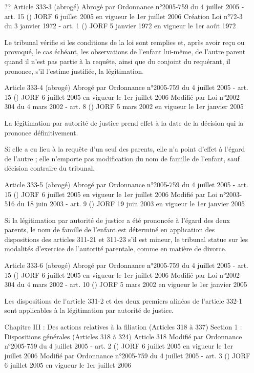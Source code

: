 \documentclass[
  12pt,
]{book}
\begin{document}
\begin{encadre}{??}
Article 333-3 (abrogé)
Abrogé par Ordonnance n°2005-759 du 4 juillet 2005 - art. 15 () JORF 6 juillet 2005 en vigueur le 1er juillet 2006
Création Loi n°72-3 du 3 janvier 1972 - art. 1 () JORF 5 janvier 1972 en vigueur le 1er août 1972

Le tribunal vérifie si les conditions de la loi sont remplies et, après avoir reçu ou provoqué, le cas échéant, les observations de l'enfant lui-même, de l'autre parent quand il n'est pas partie à la requête, ainsi que du conjoint du requérant, il prononce, s'il l'estime justifiée, la légitimation.

Article 333-4 (abrogé)
Abrogé par Ordonnance n°2005-759 du 4 juillet 2005 - art. 15 () JORF 6 juillet 2005 en vigueur le 1er juillet 2006
Modifié par Loi n°2002-304 du 4 mars 2002 - art. 8 () JORF 5 mars 2002 en vigueur le 1er janvier 2005

La légitimation par autorité de justice prend effet à la date de la décision qui la prononce définitivement.

Si elle a eu lieu à la requête d'un seul des parents, elle n'a point d'effet à l'égard de l'autre ; elle n'emporte pas modification du nom de famille de l'enfant, sauf décision contraire du tribunal.

Article 333-5 (abrogé)
Abrogé par Ordonnance n°2005-759 du 4 juillet 2005 - art. 15 () JORF 6 juillet 2005 en vigueur le 1er juillet 2006
Modifié par Loi n°2003-516 du 18 juin 2003 - art. 9 () JORF 19 juin 2003 en vigueur le 1er janvier 2005

Si la légitimation par autorité de justice a été prononcée à l'égard des deux parents, le nom de famille de l'enfant est déterminé en application des dispositions des articles 311-21 et 311-23 s'il est mineur, le tribunal statue sur les modalités d'exercice de l'autorité parentale, comme en matière de divorce.

Article 333-6 (abrogé)
Abrogé par Ordonnance n°2005-759 du 4 juillet 2005 - art. 15 () JORF 6 juillet 2005 en vigueur le 1er juillet 2006
Modifié par Loi n°2002-304 du 4 mars 2002 - art. 10 () JORF 5 mars 2002 en vigueur le 1er janvier 2005

Les dispositions de l'article 331-2 et des deux premiers alinéas de l'article 332-1 sont applicables à la légitimation par autorité de justice.

Chapitre III : Des actions relatives à la filiation (Articles 318 à 337)
Section 1 : Dispositions générales (Articles 318 à 324)
Article 318
Modifié par Ordonnance n°2005-759 du 4 juillet 2005 - art. 2 () JORF 6 juillet 2005 en vigueur le 1er juillet 2006
Modifié par Ordonnance n°2005-759 du 4 juillet 2005 - art. 3 () JORF 6 juillet 2005 en vigueur le 1er juillet 2006


\end{encadre}
\end{document}

